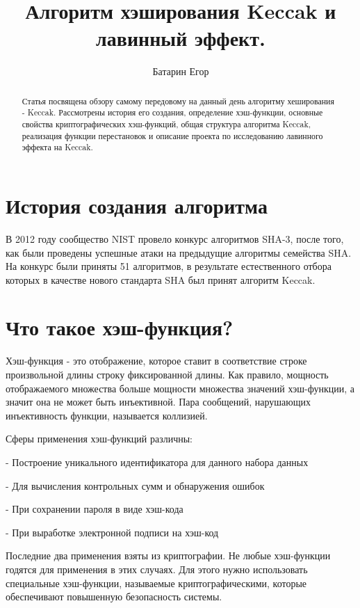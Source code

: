 \documentclass[a4paper,12pt]{article}
\author{Батарин Егор}
\title{Алгоритм хэширования Keccak и лавинный эффект.}
\date{}
\theoremstyle{plain} %
\theoremstyle{definition} %
\theoremstyle{remark} %
\begin{document}
	
	\maketitle
	
	\begin{abstract}
		
		Статья посвящена обзору самому передовому на данный день алгоритму хеширования - Keccak. Рассмотрены история его создания, определение хэш-функции, основные свойства криптографических хэш-функций, общая структура алгоритма Keccak, реализация функции перестановок и описание проекта по исследованию лавинного эффекта на Keccak.
		
	\end{abstract}
	
	\section{История создания алгоритма}
	
	В 2012 году сообщество NIST провело конкурс алгоритмов SHA-3, после того, как были проведены успешные атаки на предыдущие алгоритмы семейства SHA. На конкурс были приняты 51 алгоритмов, в результате естественного отбора которых в качестве нового стандарта SHA был принят алгоритм Keccak.
	
	\section{Что такое хэш-функция?}
	
	Хэш-функция - это отображение, которое ставит в соответствие строке произвольной длины строку фиксированной длины. Как правило, мощность отображаемого множества больше мощности множества значений хэш-функции, а значит она не может быть инъективной. Пара сообщений, нарушающих инъективность функции, называется коллизией.
	
	Сферы применения хэш-функций различны: 
	
	- Построение уникального идентификатора для данного набора данных
	
	- Для вычисления контрольных сумм и обнаружения ошибок
	
	- При сохранении пароля в виде хэш-кода
	
	- При выработке электронной подписи на хэш-код
	
	Последние два применения взяты из криптографии. Не любые хэш-функции годятся для применения в этих случаях. Для этого нужно использовать специальные хэш-функции, называемые криптографическими, которые обеспечивают повышенную безопасность системы.
	
\end{document}
